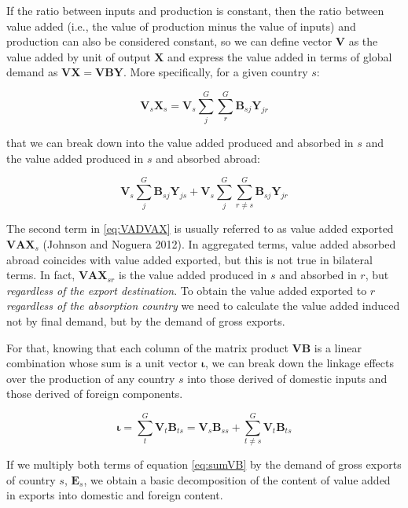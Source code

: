 If the ratio between inputs and production is constant, then the ratio between
value added (i.e., the value of production minus the value of inputs) and
production can also be considered constant, so we can define vector \(\mathbf{V}\)
as the value added by unit of output \(\mathbf{X}\) and express the value added in
terms of global demand as \(\mathbf{V} \mathbf{X} = \mathbf{V} \mathbf{BY}\). More
specifically, for a given country \(s\):

\begin{equation}
  \mathbf{V}_s \mathbf{X}_s =
    \mathbf{V}_s \sum_{j}^{G}\sum_{r}^{G}{\mathbf{B}_{sj} \mathbf{Y}_{jr}}
    \label{eq:VBY}
\end{equation}

that we can break down into the value added produced and absorbed in \(s\) and the
value added produced in \(s\) and absorbed abroad:

\begin{equation}
  \mathbf{V}_s \sum_{j}^{G}{\mathbf{B}_{sj}\mathbf{Y}_{js}} +
    \mathbf{V}_s \sum_{j}^{G} \sum_{r\neq s}^{G} {\mathbf{B}_{sj}\mathbf{Y}_{jr}}
    \label{eq:VADVAX}
\end{equation}

The second term in \eqref{eq:VADVAX} is usually referred to as value added
exported \({\mathbf{VAX}}_s\) (Johnson and Noguera 2012). In aggregated terms,
value added absorbed abroad coincides with value added exported, but this is not
true in bilateral terms. In fact, \({\mathbf{VAX}}_{sr}\) is the value added
produced in \(s\) and absorbed in \(r\), but \emph{regardless of the export destination}.
To obtain the value added exported to \(r\) \emph{regardless of the absorption country}
we need to calculate the value added induced not by final demand, but by the
demand of gross exports.

For that, knowing that each column of the matrix product
\(\mathbf{V} \mathbf{B}\) is a linear combination whose sum is a unit vector
\(\boldsymbol{\iota}\), we can break down the linkage effects over the production
of any country \(s\) into those derived of domestic inputs and those derived of
foreign components.

\begin{equation}
    \boldsymbol{\iota} = \sum_{t}^{G}{{\mathbf{V}}_t\mathbf{B}_{ts}} =
    {\mathbf{V}}_s \mathbf{B}_{ss} + \sum_{t\neq s}^{G}
    {{\mathbf{V}}_t\mathbf{B}_{ts}}
     \label{eq:sumVB}
\end{equation}

If we multiply both terms of equation \eqref{eq:sumVB} by the demand of gross
exports of country \(s\), \(\mathbf{E}_s\), we obtain a basic decomposition of the
content of value added in exports into domestic and foreign content.

